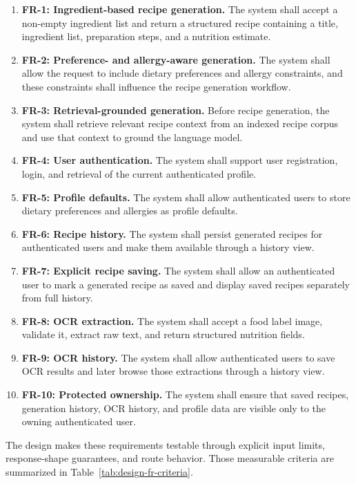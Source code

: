\begin{enumerate}
	\item \textbf{FR-1: Ingredient-based recipe generation.} The system
	shall accept a non-empty ingredient list and return a structured
	recipe containing a title, ingredient list, preparation steps, and a
	nutrition estimate.
	\item \textbf{FR-2: Preference- and allergy-aware generation.} The
	system shall allow the request to include dietary preferences and
	allergy constraints, and these constraints shall influence the recipe
	generation workflow.
	\item \textbf{FR-3: Retrieval-grounded generation.} Before recipe
	generation, the system shall retrieve relevant recipe context from an
	indexed recipe corpus and use that context to ground the language
	model.
	\item \textbf{FR-4: User authentication.} The system shall support
	user registration, login, and retrieval of the current authenticated
	profile.
	\item \textbf{FR-5: Profile defaults.} The system shall allow
	authenticated users to store dietary preferences and allergies as
	profile defaults.
	\item \textbf{FR-6: Recipe history.} The system shall persist generated
	recipes for authenticated users and make them available through a
	history view.
	\item \textbf{FR-7: Explicit recipe saving.} The system shall allow an
	authenticated user to mark a generated recipe as saved and display
	saved recipes separately from full history.
	\item \textbf{FR-8: OCR extraction.} The system shall accept a food
	label image, validate it, extract raw text, and return structured
	nutrition fields.
	\item \textbf{FR-9: OCR history.} The system shall allow authenticated
	users to save OCR results and later browse those extractions through a
	history view.
	\item \textbf{FR-10: Protected ownership.} The system shall ensure that
	saved recipes, generation history, OCR history, and profile data are
	visible only to the owning authenticated user.
\end{enumerate}

The design makes these requirements testable through explicit input
limits, response-shape guarantees, and route behavior. Those measurable
criteria are summarized in Table~\ref{tab:design-fr-criteria}.


